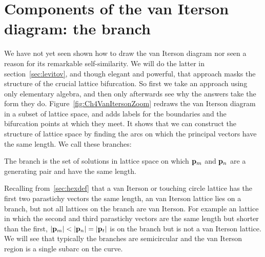 \section{Components of the van Iterson diagram: the  branch}
\label{sec:mequalsn}
We have not yet seen shown how to draw the van Iterson diagram nor seen a reason for its remarkable self-similarity. We will do the latter in section~\ref{sec:levitov}, and though elegant and powerful, that approach masks the structure of the crucial lattice bifurcation.  So first we take an approach using only elementary algebra, and then only afterwards see why the answers take the form they do. 
Figure~\ref{fig:Ch4VanItersonZoom} redraws 
the van Iterson diagram in a subset of lattice space, and adds labels for the boundaries and the bifurcation points at which they meet. 
%
It shows that we can construct the structure of lattice space by finding the arcs on which  the principal vectors have the same length. We call these branches: 
\begin{definition}
The branch   is the set of solutions in lattice space on which ${\mathbf p}_{m}$ and ${\mathbf p}_{n}$ are a generating pair and have the same length.
\end{definition}
Recalling from~\ref{sec:hexdef} that a van Iterson or touching circle lattice has the first two parastichy vectors the same length, an  van Iterson lattice 
 lies on a  branch, but not all lattices on the branch are van Iterson.  For example an  lattice in which the second and third parastichy vectors are the same length but shorter than the first, $|{\mathbf p}_{m}| < |{\mathbf p}_{n}| = |{\mathbf p}_{t}|$ is on the  branch but is not a van Iterson lattice. We will see that typically the branches are semicircular and the van Iterson region is a single subarc on the curve. 



